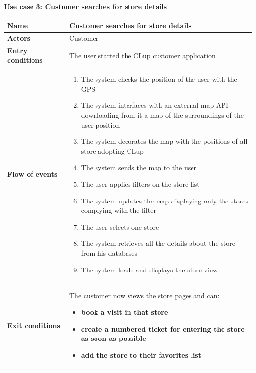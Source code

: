 \clearpage
\textbf{Use case 3: Customer searches for store details}
\smallskip
{}
\begin{longtable}{p{0.25\linewidth}p{0.75\linewidth}}
    \toprule
    \textbf{Name}                             & \textbf{Customer searches for store details}    \\
    \midrule
    \textbf{Actors}                           & Customer                                        \\
    \midrule
    \textbf{Entry conditions}                 & The user started the CLup customer application  \\
    \midrule
    \textbf{Flow of events}                   &
    \begin{enumerate}
        \item The system checks the position of the user with the GPS
        \item The system interfaces with an external map API downloading from it a map of the surroundings of the user position
        \item The system decorates the map with the positions of all store adopting CLup
        \item The system sends the map to the user
        \item The user applies filters on the store list
        \item The system updates the map displaying only the stores complying with the filter
        \item The user selects one store
        \item The system retrieves all the details about the store from his databases
        \item The system loads and displays the store view
    \end{enumerate}                                                                  \\
    \midrule
    \textbf{Exit conditions}                  & The customer now views the store pages and can:
    \begin{itemize}
        \item \textbf{book a visit in that store}
        \item \textbf{create a numbered ticket for entering the store as soon as possible}
        \item \textbf{add the store to their favorites list}
    \end{itemize}                                                                  \\

\end{longtable}
